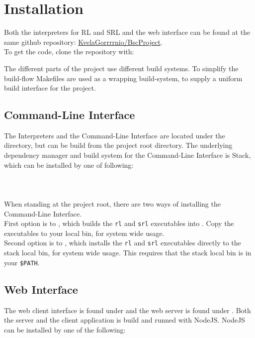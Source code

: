 \section*{Installation}

Both the interpreters for RL and SRL and the web interface can be found at the same github repository: \href{https://github.com/KvelaGorrrrnio/BscProject}{KvelaGorrrrnio/BscProject}.\\
To get the code, clone the repository with:

The different parts of the project use different build systems. To simplify the build-flow Makefiles are used as a wrapping build-system, to supply a uniform build interface for the project.

\subsection*{Command-Line Interface}
The Interpreters and the Command-Line Interface are located under the  directory, but can be build from the project root directory.
The underlying dependency manager and build system for the Command-Line Interface is Stack, which can be installed by one of following:\\
\\
\\
\\

\noindent
When standing at the project root, there are two ways of installing the Command-Line Interface.\\
First option is to , which builds the \texttt{rl} and \texttt{srl} executables into . Copy the executables to your local bin, for system wide usage.\\
Second option is to , which installs the \texttt{rl} and \texttt{srl} executables directly to the stack local bin, for system wide usage. This requires that the stack local bin is in your \texttt{\$PATH}.

\subsection*{Web Interface}

The web client interface is found under  and the web server is found under .
Both the server and the client application is build and runned with NodeJS. NodeJS can be installed by one of the following:\\
\\
\\
\\

